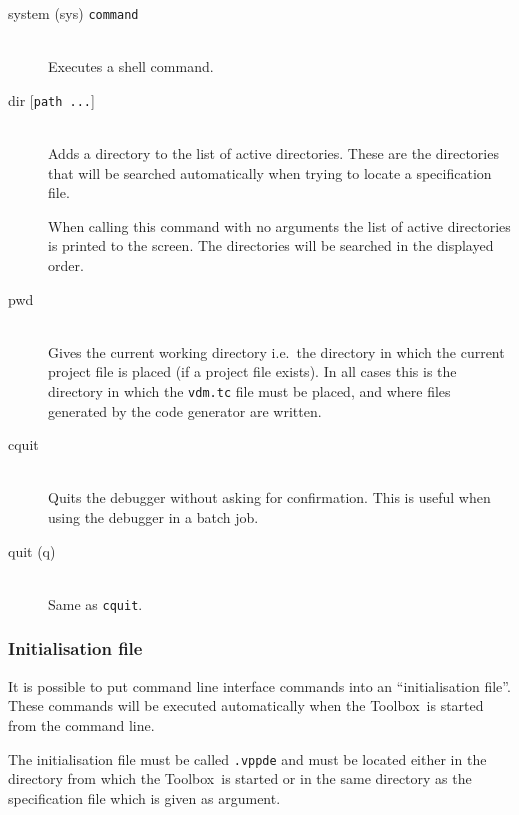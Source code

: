\documentclass[\pformat,12pt]{article}
\newcommand{\Toolbox}{Toolbox}
\newcommand{\vdmde}{vppde}
\begin{document}
\begin{description}
\item[system (sys) {\tt command}]\mbox{}\\
  Executes a shell command.

\item[dir \mbox{[{\tt path ...}]}] \mbox{}\\
  Adds a directory to the list of active directories. These are the
  directories that will be searched automatically when trying to
  locate a specification file.
  
  When calling this command with no arguments the list of active
  directories is printed to the screen. The directories will be
  searched in the displayed order.

\item[pwd]  \mbox{}\\
  Gives the current working directory i.e.\ the directory in which
  the current project file is placed (if a project file exists). In
  all cases this is the directory in which the \texttt{vdm.tc} file must
  be placed, and where files generated by the code generator
   are written.

\item[cquit]  \mbox{}\\
  Quits the debugger without asking for confirmation.  This is useful
  when using the debugger in a batch job.

\item[quit (q)] \mbox{}\\
  Same as {\tt cquit}.


\end{description}

\subsubsection{Initialisation file} 

It is possible to put command line interface commands into an
``initialisation file''. These commands will be executed automatically 
when the \Toolbox\ is started from the command line.

The initialisation file must be called {\tt .\vdmde}\index{.\vdmde\ file} 
and must be located either in the directory from which the
\Toolbox\ is started or in the same directory as the specification
file which is given as argument.
\end{document}
